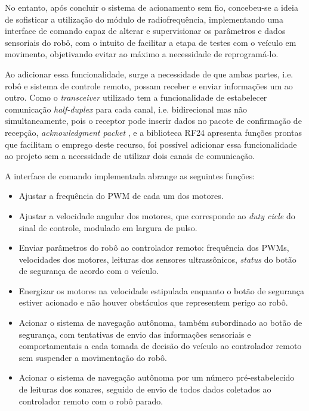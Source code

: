 No entanto, após concluir o sistema de acionamento sem fio, concebeu-se a ideia de sofisticar a utilização do módulo de radiofrequência, 
implementando uma interface de comando capaz de alterar e supervisionar os parâmetros e dados sensoriais do robô, com o intuito de facilitar a etapa 
de testes com o veículo em movimento, objetivando evitar ao máximo a necessidade de reprogramá-lo.

Ao adicionar essa funcionalidade, surge a necessidade de que ambas partes, i.e. robô e sistema de controle remoto, possam receber e enviar 
informações um ao outro.
Como o \textit{transceiver} utilizado tem a funcionalidade de estabelecer comunicação \textit{half-duplex} para cada canal, i.e. bidirecional mas não 
simultaneamente, pois o receptor pode inserir dados no pacote de confirmação de recepção, \textit{acknowledgment packet} \cite{nRF}, e a biblioteca 
RF24 apresenta funções prontas que facilitam o emprego deste recurso, foi possível adicionar essa funcionalidade ao projeto sem a necessidade de 
utilizar dois canais de comunicação.

A interface de comando implementada abrange as seguintes funções:
\begin{itemize}
 \item Ajustar a frequência do PWM de cada um dos motores.
 \item Ajustar a velocidade angular dos motores, que corresponde ao \textit{duty cicle} do sinal de controle, modulado em largura de pulso.
 \item Enviar parâmetros do robô ao controlador remoto: frequência dos PWMs, velocidades dos motores, leituras dos sensores ultrassônicos, 
\textit{status} do botão de segurança de acordo com o veículo.
 \item Energizar os motores na velocidade estipulada enquanto o botão de segurança estiver acionado e não houver obstáculos que representem perigo ao 
robô.
 \item Acionar o sistema de navegação autônoma, também subordinado ao botão de segurança, com tentativas de envio das informações sensoriais e 
comportamentais a cada tomada de decisão do veículo ao controlador remoto sem suspender a movimentação do robô.
 \item Acionar o sistema de navegação autônoma por um número pré-estabelecido de leituras dos sonares, seguido de envio de todos dados coletados ao 
controlador remoto com o robô parado.
\end{itemize}


